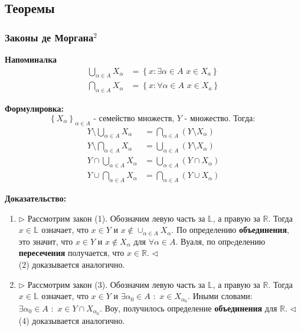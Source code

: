 \documentclass{article}
\begin{document}
\newpage
\subsection{Теоремы}

\subsubsection{Законы де Моргана\texorpdfstring{$^2$}{}}
\textbf{Напоминалка}
\begin{align}
\bigcup_{\alpha \in A}{X_\alpha} &= \left\{ x : \exists \alpha \in A \,\, x \in X_a\right\}\\
\bigcap_{\alpha \in A}{X_\alpha} &= \left\{ x : \forall \alpha \in A \,\, x \in X_a\right\} 
\end{align}

\textbf{Формулировка:}
\begin{equation*}
    \left\{X_\alpha\right\}_{\alpha \in A}\textit{ - семейство множеств, }Y\textit{ - множество. Тогда: }
\end{equation*}
\begin{align}
Y \setminus \bigcup_{\alpha \in A}{X_\alpha} &= \bigcap_{\alpha \in A}{\left(Y \setminus X_\alpha\right)}\\
Y \setminus \bigcap_{\alpha \in A}{X_\alpha} &= \bigcup_{\alpha \in A}{\left(Y \setminus X_\alpha\right)}\\
Y \cap \bigcup_{\alpha \in A}{X_\alpha} &= \bigcup_{\alpha \in A}{\left(Y \cap X_\alpha\right)}\\
Y \cup \bigcap_{\alpha \in A}{X_\alpha} &= \bigcap_{\alpha \in A}{\left(Y \cup X_\alpha\right)}
\end{align}

\textbf{Доказательство:}
\begin{enumerate}
    \item $\rhd$ Рассмотрим закон (1). Обозначим левую часть за $\mathbb{L}$, а правую за $\mathbb{R}$. Тогда $x \in \mathbb{L}$
    означает, что $x \in Y$ и $x \notin \cup_{\alpha \in A} X_\alpha$. По определению \textbf{объединения}, это значит, что $x \in Y$ и $x \notin X_\alpha$ для $\forall \alpha \in A$. Вуаля, по опрeделению \textbf{пересечения} получается, что $x \in \mathbb{R}$. $\lhd$ \\ (2) доказывается аналогично.
    \item $\rhd$ Рассмотрим закон (3). Обозначим левую часть за $\mathbb{L}$, а правую за $\mathbb{R}$. Тогда $x \in \mathbb{L}$
    означает, что $x \in Y$ и $\exists \alpha_0 \in A \,\,:\,\, x \in X_{\alpha_0}$. Иными словами: $\exists \alpha_0 \in A \,\,:\,\, x \in Y \cap X_{\alpha_0}$. Воу, получилось определение \textbf{объединения} для $\mathbb{R}$. $\lhd$ \\ (4) доказывается аналогично.
\end{enumerate}
\end{document}
